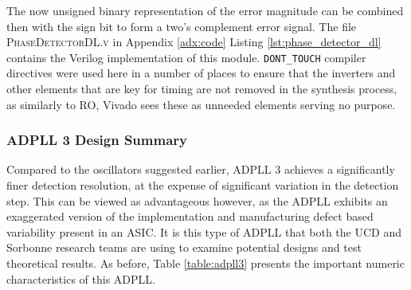 The now unsigned binary representation of the error magnitude can be combined then with the sign bit to form a two's complement error signal. The file \textsc{PhaseDetectorDL.v} in Appendix \ref{adx:code} Listing \ref{lst:phase_detector_dl} contains the Verilog implementation of this module. \texttt{DONT\_TOUCH} compiler directives were used here in a number of places to ensure that the inverters and other elements that are key for timing are not removed in the synthesis process, as similarly to \ac{RO}, Vivado sees these as unneeded elements serving no purpose.

\subsubsection{\acs{ADPLL} 3 Design Summary}
Compared to the oscillators suggested earlier, \ac{ADPLL} 3 achieves a significantly finer detection resolution, at the expense of significant variation in the detection step. This can be viewed as advantageous however, as the \ac{ADPLL} exhibits an exaggerated version of the implementation and manufacturing defect based variability present in an \ac{ASIC}. It is this type of \ac{ADPLL} that both the \acs{UCD} and Sorbonne research teams are using to examine potential designs and test theoretical results. As before, Table \ref{table:adpll3} presents the important numeric characteristics of this \ac{ADPLL}.


